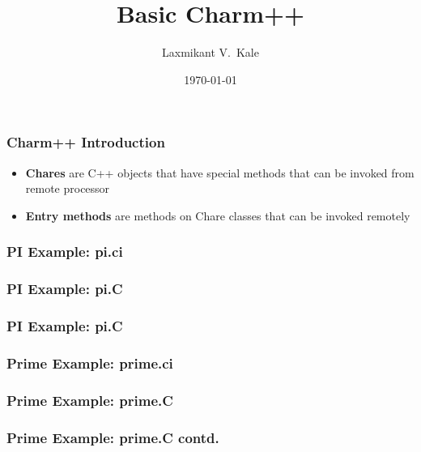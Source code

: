 \documentclass{beamer}
\title{Basic Charm++}
\author[Laxmikant V.~Kale]{
Laxmikant V.~Kale
}
\date{\today}
\begin{document}
\begin{frame}[fragile]
  \frametitle{Charm++ Introduction}
    \begin{itemize}
    \item \textbf{Chares} are C++ objects that have special methods that can be invoked
    from remote processor
    \item \textbf{Entry methods} are methods on Chare classes that can be invoked
    remotely
    \end{itemize}
\end{frame}



\begin{frame}[fragile]
  \frametitle{PI Example: pi.ci}
  
\end{frame}

\begin{frame}[fragile]
  \frametitle{PI Example: pi.C}
  
\end{frame}

\begin{frame}[fragile]
  \frametitle{PI Example: pi.C}
  
\end{frame}

\begin{frame}[fragile]
  \frametitle{Prime Example: prime.ci}
  
\end{frame}

\begin{frame}[fragile]
  \frametitle{Prime Example: prime.C}
  
\end{frame}

\begin{frame}[fragile]
  \frametitle{Prime Example: prime.C contd.}
  
\end{frame}
\end{document}
